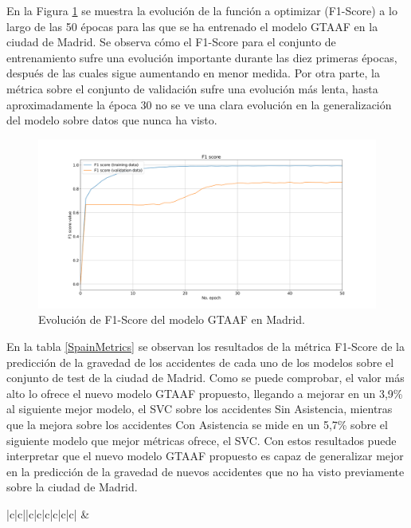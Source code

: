 \documentclass{uathesis-es}
\begin{document}
{		En la Figura \ref{MadridLossFunction} se muestra la evolución de la función a optimizar (F1-Score) a lo largo de las 50 épocas para las que se ha entrenado el modelo GTAAF en la ciudad de Madrid. Se observa cómo el F1-Score para el conjunto de entrenamiento sufre una evolución importante durante las diez primeras épocas, después de las cuales sigue aumentando en menor medida. Por otra parte, la métrica sobre el conjunto de validación sufre una evolución más lenta, hasta aproximadamente la época 30 no se ve una clara evolución en la generalización del modelo sobre datos que nunca ha visto.
		
		
		\begin{figure}[h]
			\centering
			\includegraphics[width=160mm]{Figures/Madrid/madrid_convolution_2d_f1_score_2023-12-03-12 54 29.png}
			\caption{Evolución de F1-Score del modelo GTAAF en Madrid.}
			\label{MadridLossFunction}
		\end{figure}
		
		En la tabla \ref{SpainMetrics} se observan los resultados de la métrica F1-Score de la predicción de la gravedad de los accidentes de cada uno de los modelos sobre el conjunto de test de la ciudad de Madrid. Como se puede comprobar, el valor más alto lo ofrece el nuevo modelo GTAAF propuesto, llegando a mejorar en un 3,9\% al siguiente mejor modelo, el SVC sobre los accidentes Sin Asistencia, mientras que la mejora sobre los accidentes Con Asistencia se mide en un 5,7\% sobre el siguiente modelo que mejor métricas ofrece, el SVC. Con estos resultados puede interpretar que el nuevo modelo GTAAF propuesto es capaz de generalizar mejor en la predicción de la gravedad de nuevos accidentes que no ha visto previamente sobre la ciudad de Madrid.
		
		\begin{table}[H]
			\begin{center}
				\begin{tabular}{|c|c||c|c|c|c|c|c|}
					\hline
					 &
					 \\ \hline
					

\end{tabular}
\end{center}
\end{table}}
\end{document}
